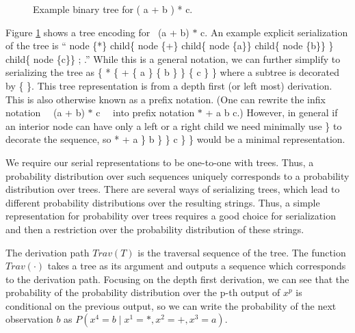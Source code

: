 \documentclass{article}
\begin{document}
\begin{figure}[tbh!]
\centering
{}
\caption{Example binary tree for ( a + b ) * c.} \label{fig:tree_motivation}
\end{figure}

Figure \ref{fig:tree_motivation}
shows a tree encoding for \ (a + b) $*$ c. An example explicit serialization of the tree is  ``
node  \{*\}
        child\{ node  \{+\}
            child\{ node  \{a\}\}
            child\{ node  \{b\}\}
        \}
        child\{ node  \{c\}\}
; 
.''
While this is a general notation, we can further simplify to serializing the tree as \{ * \{ + \{ a \} \{ b \} \} \{ c \} \} where a subtree is decorated by \{ \}. This tree representation is from a depth first (or left most) derivation. This is also otherwise known as a prefix notation. (One can rewrite the infix notation \ \ (a + b) $*$ c \ \ into prefix notation $*$ + a b c.) However, in general if an interior node can have only a left or a right child we need minimally use \} to decorate the sequence, so  *  +  a \}  b \} \}  c \} \} would be a minimal representation.
 
We require our serial representations to be one-to-one with trees.  Thus, a probability distribution over such sequences uniquely corresponds to a probability distribution over trees. There are several ways of serializing trees, which lead to different probability distributions over the resulting strings. 
Thus, a simple representation for probability over trees requires a good choice for serialization and then a restriction over the probability distribution of these strings.
 
The derivation path $Trav(T)$ is the traversal sequence of the tree. The function $Trav(\cdot)$ takes a tree as its argument and outputs a sequence which corresponds to the derivation path. 
Focusing on the depth first derivation, we can see that the probability of the probability distribution over the p-th output of $x^p$ is conditional on the previous output, so we can write the probability of the next observation $b$ as $P(x^4=b \mid  x^1=*, x^2=+, x^3=a)$.
%  
\end{document}
